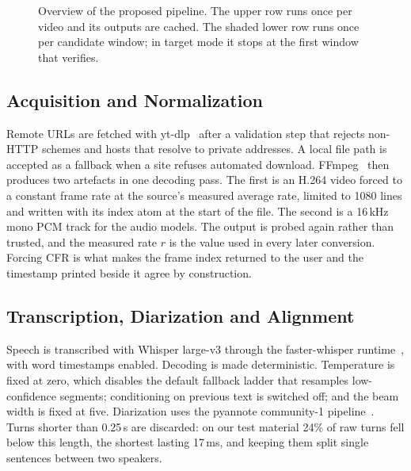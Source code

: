 \documentclass[conference]{IEEEtran}
\begin{document}
\begin{figure}[t]
{}
\caption{Overview of the proposed pipeline. The upper row runs once per video and its outputs are cached. The shaded lower row runs once per candidate window; in target mode it stops at the first window that verifies.}
\label{fig:pipeline}
\end{figure}

\subsection{Acquisition and Normalization}
Remote URLs are fetched with yt-dlp~\cite{ytdlp} after a validation step that rejects non-HTTP schemes and hosts that resolve to private addresses. A local file path is accepted as a fallback when a site refuses automated download. FFmpeg~\cite{ffmpeg} then produces two artefacts in one decoding pass. The first is an H.264 video forced to a constant frame rate at the source's measured average rate, limited to 1080 lines and written with its index atom at the start of the file. The second is a 16\,kHz mono PCM track for the audio models. The output is probed again rather than trusted, and the measured rate $r$ is the value used in every later conversion. Forcing CFR is what makes the frame index returned to the user and the timestamp printed beside it agree by construction.

\subsection{Transcription, Diarization and Alignment}
Speech is transcribed with Whisper large-v3 through the faster-whisper runtime~\cite{fasterwhisper}, with word timestamps enabled. Decoding is made deterministic. Temperature is fixed at zero, which disables the default fallback ladder that resamples low-confidence segments; conditioning on previous text is switched off; and the beam width is fixed at five. Diarization uses the pyannote community-1 pipeline~\cite{bredin2023pyannote}. Turns shorter than 0.25\,s are discarded: on our test material 24\% of raw turns fell below this length, the shortest lasting 17\,ms, and keeping them split single sentences between two speakers.
\end{document}
